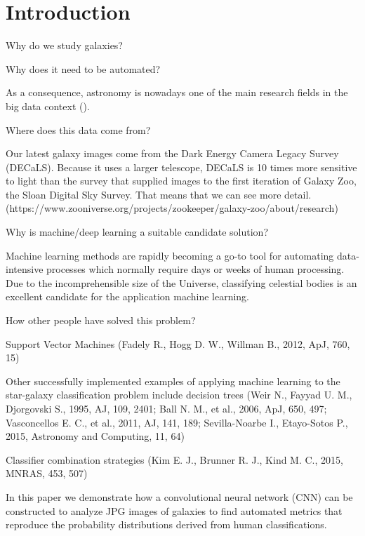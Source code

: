 \section{Introduction}

Why do we study galaxies?

Why does it need to be automated?

As a consequence, astronomy is nowadays one of the main research fields in the big data context (\citeauthor{microsoft-galaxies}).

Where does this data come from?

Our latest galaxy images come from the Dark Energy Camera Legacy Survey (DECaLS). Because it uses a larger telescope, DECaLS is 10 times more sensitive to light than the survey that supplied images to the first iteration of Galaxy Zoo, the Sloan Digital Sky Survey. That means that we can see more detail. (https://www.zooniverse.org/projects/zookeeper/galaxy-zoo/about/research)

Why is machine/deep learning a suitable candidate solution?

Machine learning methods are rapidly becoming a go-to tool for automating data-intensive processes which normally require days or weeks of human processing. Due to the incomprehensible size of the Universe, classifying celestial bodies is an excellent candidate for the application machine learning.


How other people have solved this problem?

Support Vector Machines (Fadely R., Hogg D. W., Willman B., 2012, ApJ, 760, 15)

Other successfully implemented examples of applying machine learning to the star-galaxy classification problem include decision trees (Weir N., Fayyad U. M., Djorgovski S., 1995, AJ, 109, 2401; Ball N. M., et al., 2006, ApJ, 650, 497; Vasconcellos E. C., et al., 2011, AJ, 141, 189; Sevilla-Noarbe I., Etayo-Sotos P., 2015, Astronomy and Computing, 11, 64)

Classifier combination strategies (Kim E. J., Brunner R. J., Kind M. C., 2015, MNRAS, 453, 507)

In this paper we demonstrate how a convolutional neural network (CNN) can be constructed to analyze JPG images of galaxies to find automated metrics that reproduce the probability distributions derived from human classifications.
